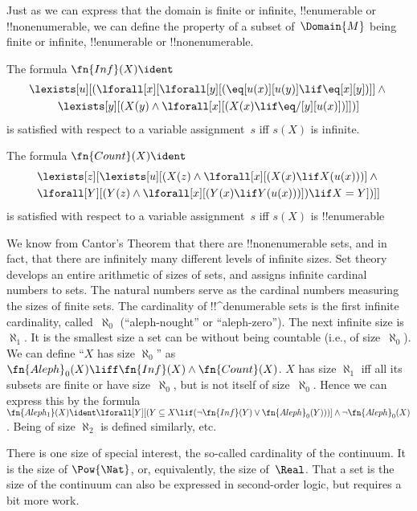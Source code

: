 \documentclass[../../../include/open-logic-section]{subfiles}
\begin{document}


\begin{explain}
Just as we can express that the domain is finite or infinite,
!!{enumerable} or !!{nonenumerable}, we can define the property of a
subset of~$\Domain{M}$ being finite or infinite, !!{enumerable} or
!!{nonenumerable}.
\end{explain}

\begin{prop}
The formula $\fn{Inf}(X) \ident$
\begin{multline*}
\lexists[u][(\lforall[x][\lforall[y][(\eq[u(x)][u(y)] \lif 
      \eq[x][y])]] \land {} \\\lexists[y][(X(y) \land \lforall[x][(X(x)
      \lif \eq/[y][u(x)])]])]
\end{multline*}
is satisfied with respect to a variable assignment~$s$ iff $s(X)$ is
infinite.
\end{prop}

\begin{prop}
The formula $\fn{Count}(X) \ident $
\begin{multline*}
\lexists[z][\lexists[u][(X(z) \land 
    \lforall[x][(X(x) \lif X(u(x)))] \land {} \\ \lforall[Y][(Y(z) \land
      \lforall[x][(Y(x) \lif Y(u(x)))]) \lif X = Y])]]
\end{multline*}
is satisfied with respect to a variable assignment~$s$ iff $s(X)$ is
!!{enumerable}
\end{prop}

We know from Cantor's Theorem that there are !!{nonenumerable} sets,
and in fact, that there are infinitely many different levels of
infinite sizes.  Set theory develops an entire arithmetic of sizes of
sets, and assigns infinite cardinal numbers to sets.  The natural
numbers serve as the cardinal numbers measuring the sizes of finite
sets. The cardinality of !!^{denumerable} sets is the first infinite
cardinality, called~$\aleph_0$ (``aleph-nought'' or
``aleph-zero''). The next infinite size is~$\aleph_1$. It is the
smallest size a set can be without being countable (i.e., of
size~$\aleph_0$).  We can define ``$X$ has size $\aleph_0$'' as
$\fn{Aleph}_0(X) \liff \fn{Inf}(X) \land \fn{Count}(X)$.  $X$ has size
$\aleph_1$ iff all its subsets are finite or have size~$\aleph_0$, but
is not itself of size~$\aleph_0$. Hence we can express this by the
formula $\fn{Aleph_1}(X) \ident \lforall[Y][(Y \subseteq X \lif
  (\lnot\fn{Inf}(Y) \lor \fn{Aleph}_0(Y)))] \land \lnot
\fn{Aleph}_0(X)$. Being of size $\aleph_2$ is defined similarly, etc.

There is one size of special interest, the so-called cardinality of
the continuum.  It is the size of $\Pow{\Nat}$, or, equivalently, the
size of~$\Real$. That a set is the size of the continuum can also be
expressed in second-order logic, but requires a bit more work.
\end{document}
